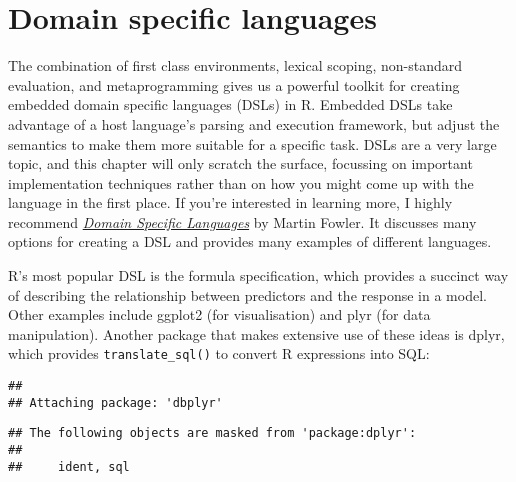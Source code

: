 \hypertarget{dsl}{%
\chapter{Domain specific languages}\label{dsl}}

The combination of first class environments, lexical scoping,
non-standard evaluation, and metaprogramming gives us a powerful toolkit
for creating embedded domain specific languages (DSLs) in R. Embedded
DSLs take advantage of a host language's parsing and execution
framework, but adjust the semantics to make them more suitable for a
specific task. DSLs are a very large topic, and this chapter will only
scratch the surface, focussing on important implementation techniques
rather than on how you might come up with the language in the first
place. If you're interested in learning more, I highly recommend
\href{http://amzn.com/0321712943?tag=devtools-20}{\emph{Domain Specific
Languages}} by Martin Fowler. It discusses many options for creating a
DSL and provides many examples of different languages.

R's most popular DSL is the formula specification, which provides a
succinct way of describing the relationship between predictors and the
response in a model. Other examples include ggplot2 (for visualisation)
and plyr (for data manipulation). Another package that makes extensive
use of these ideas is dplyr, which provides \texttt{translate\_sql()} to
convert R expressions into SQL:

\begin{Shaded}
\begin{Highlighting}[]
\end{Highlighting}
\end{Shaded}

\begin{verbatim}
## 
## Attaching package: 'dbplyr'
\end{verbatim}

\begin{verbatim}
## The following objects are masked from 'package:dplyr':
## 
##     ident, sql
\end{verbatim}

\begin{Shaded}
\begin{Highlighting}[]
\NormalTok{(}\OperatorTok{+}\StringTok{ }
\end{Highlighting}
\end{Shaded}

